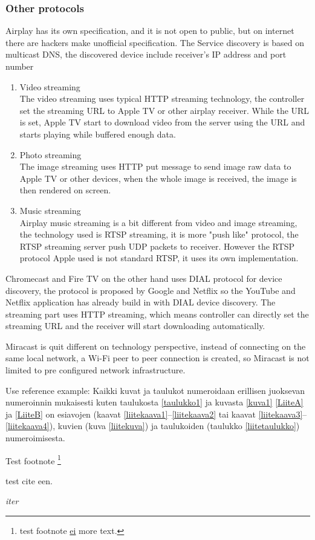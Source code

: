 \subsubsection*{Other protocols}
Airplay has its own specification, and it is not open to public, but on internet there are hackers make unofficial specification. The Service discovery is based on multicast DNS, the discovered device include receiver's IP address and port number
\begin{enumerate}
\item Video streaming \\
The video streaming uses typical HTTP streaming technology, the controller set the streaming URL to Apple TV or other airplay receiver. While the URL is set, Apple TV start to download video from the server using the URL and starts playing while buffered enough data.
\item Photo streaming \\
The image streaming uses HTTP put message to send image raw data to Apple TV or other devices, when the whole image is received, the image is then rendered on screen.
\item Music streaming \\
Airplay music streaming is a bit different from video and image streaming, the technology used is RTSP streaming, it is more "push like" protocol, the RTSP streaming server push UDP packets to receiver. However the RTSP protocol Apple used is not standard RTSP, it uses its own implementation.
\end{enumerate}
Chromecast and Fire TV on the other hand uses DIAL protocol for device discovery, the protocol is proposed by Google and Netflix so the YouTube and Netflix application has already build in with DIAL device discovery. The streaming part uses HTTP streaming, which means controller can directly set the streaming URL and the receiver will start downloading automatically.

Miracast is quit different on technology perspective, instead of connecting on the same local network, a Wi-Fi peer to peer connection is created, so Miracast is not limited to pre configured network infrastructure.

Use reference example:
Kaikki kuvat ja taulukot numeroidaan erillisen juoksevan numeroinnin
mukaisesti kuten taulukosta \ref{taulukko1} ja kuvasta \ref{kuva1} \ref{LiiteA} ja \ref{LiiteB} on
esiavojen (kaavat \ref{liitekaava1}--\ref{liitekaava2} tai
kaavat \ref{liitekaava3}--\ref{liitekaava4}), kuvien (kuva
\ref{liitekuva}) ja taulukoiden (taulukko \ref{liitetaulukko})
numeroimisesta. 

Test footnote
\footnote{test footnote \underline{ei} more text.}

test cite \cite{Kauranen} een. \cite{Kauranen} 

\textit{iter}
